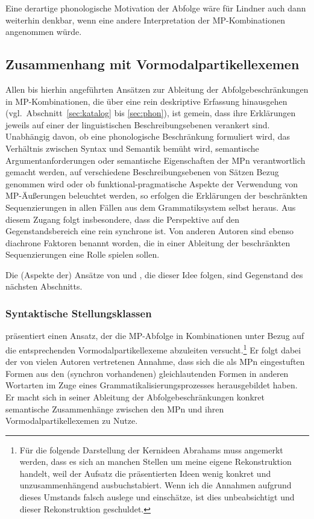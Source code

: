 Eine derartige phonologische Motivation der Abfolge wäre für Lindner auch dann weiterhin denkbar, wenn eine andere Interpretation der MP-Kom\-bi\-na\-ti\-on\-en angenommen würde. 	

\subsection{Zusammenhang mit Vormodalpartikellexemen}
\label{sec:vormp}
Allen bis hierhin angeführten Ansätzen zur Ableitung der Abfolgebeschränkungen in MP-Kom\-bi\-na\-ti\-on\-en, die über eine rein deskriptive Erfassung hinausgehen (vgl.\ Abschnitt~\ref{sec:katalog} bis \ref{sec:phon}), ist gemein, dass ihre Erklärungen jeweils auf einer der linguistischen Beschreibungsebenen verankert sind. Unabhängig davon, ob eine phonologische Beschränkung formuliert wird, das Verhältnis zwischen Syntax und Semantik bemüht wird, semantische Argumentanforderungen oder semantische Eigenschaften der MPn verantwortlich gemacht werden, auf verschie\-dene Beschreibungsebenen von Sätzen Bezug genommen wird oder ob funktional-pragmatische Aspekte der Verwendung von MP-Äußerungen beleuchtet werden, so erfolgen die Erklärungen der beschränkten Sequenzierungen in allen Fällen aus dem Grammatiksystem selbst heraus. Aus diesem Zugang folgt insbesondere, dass die Perspektive auf den Gegenstandsbereich eine rein synchrone  ist. Von anderen Autoren sind ebenso diachrone  Faktoren benannt worden, die in einer Ableitung der beschränkten Sequenzierungen eine Rolle spielen sollen.

Die (Aspekte der) Ansätze von \citet{Vismans1994} und \citet{Abraham1995}, die dieser Idee folgen, sind Gegenstand des nächsten Abschnitts.

\subsubsection{Syntaktische Stellungsklassen}
\citet{Abraham1995} präsentiert einen Ansatz, der die MP-Abfolge in Kombinatio\-nen unter Bezug auf die entsprechenden Vormodalpartikellexeme  abzuleiten versucht.\footnote{Für die folgende Darstellung der Kernideen Abrahams muss angemerkt werden, dass es sich an manchen Stellen um meine eigene Rekonstruktion handelt, weil der Aufsatz die präsentierten Ideen wenig konkret und unzusammenhängend ausbuchstabiert. Wenn ich die Annahmen aufgrund dieses Umstands falsch auslege und einschätze, ist dies unbeabsichtigt und dieser Rekonstruktion geschuldet.} Er folgt dabei der von vielen Autoren vertretenen Annahme, dass sich die als MPn eingestuften Formen aus den (synchron vorhandenen) gleichlautenden Formen in anderen Wortarten im Zuge eines Grammatikalisierungsprozesses  herausgebildet haben. Er macht sich in seiner Ableitung der Abfolgebeschränkungen konkret semantische Zusammenhänge zwischen den MPn und ihren Vormodalpartikellexemen zu Nutze. 

